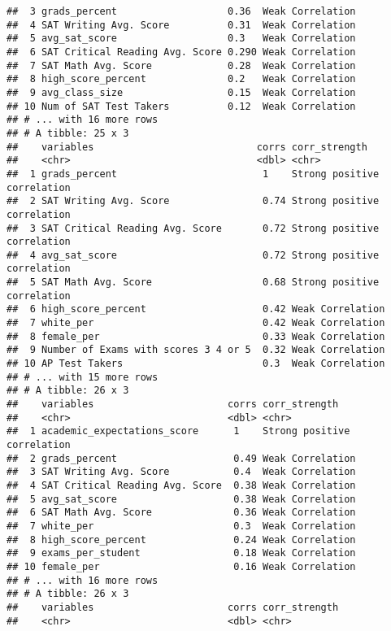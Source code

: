 \documentclass[]{article}
\begin{document}
\begin{verbatim}
##  3 grads_percent                   0.36  Weak Correlation           
##  4 SAT Writing Avg. Score          0.31  Weak Correlation           
##  5 avg_sat_score                   0.3   Weak Correlation           
##  6 SAT Critical Reading Avg. Score 0.290 Weak Correlation           
##  7 SAT Math Avg. Score             0.28  Weak Correlation           
##  8 high_score_percent              0.2   Weak Correlation           
##  9 avg_class_size                  0.15  Weak Correlation           
## 10 Num of SAT Test Takers          0.12  Weak Correlation           
## # ... with 16 more rows
## # A tibble: 25 x 3
##    variables                            corrs corr_strength              
##    <chr>                                <dbl> <chr>                      
##  1 grads_percent                         1    Strong positive correlation
##  2 SAT Writing Avg. Score                0.74 Strong positive correlation
##  3 SAT Critical Reading Avg. Score       0.72 Strong positive correlation
##  4 avg_sat_score                         0.72 Strong positive correlation
##  5 SAT Math Avg. Score                   0.68 Strong positive correlation
##  6 high_score_percent                    0.42 Weak Correlation           
##  7 white_per                             0.42 Weak Correlation           
##  8 female_per                            0.33 Weak Correlation           
##  9 Number of Exams with scores 3 4 or 5  0.32 Weak Correlation           
## 10 AP Test Takers                        0.3  Weak Correlation           
## # ... with 15 more rows
## # A tibble: 26 x 3
##    variables                       corrs corr_strength              
##    <chr>                           <dbl> <chr>                      
##  1 academic_expectations_score      1    Strong positive correlation
##  2 grads_percent                    0.49 Weak Correlation           
##  3 SAT Writing Avg. Score           0.4  Weak Correlation           
##  4 SAT Critical Reading Avg. Score  0.38 Weak Correlation           
##  5 avg_sat_score                    0.38 Weak Correlation           
##  6 SAT Math Avg. Score              0.36 Weak Correlation           
##  7 white_per                        0.3  Weak Correlation           
##  8 high_score_percent               0.24 Weak Correlation           
##  9 exams_per_student                0.18 Weak Correlation           
## 10 female_per                       0.16 Weak Correlation           
## # ... with 16 more rows
## # A tibble: 26 x 3
##    variables                       corrs corr_strength              
##    <chr>                           <dbl> <chr>                      

\end{verbatim}
\end{document}

